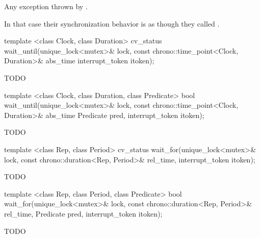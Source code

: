 {\begin{itemdescr}
  \throws Any exception thrown by .

  \pnum\sync In that case their synchronization behavior is as though they called .
\end{itemdescr}

\begin{itemdecl}
template <class Clock, class Duration>
  cv_status wait_until(unique_lock<mutex>& lock,
                       const chrono::time_point<Clock, Duration>& abs_time
                       interrupt_token itoken);
\end{itemdecl}
\begin{itemdescr}
 \pnum\effects TODO
\end{itemdescr}

\begin{itemdecl}
template <class Clock, class Duration, class Predicate>
  bool wait_until(unique_lock<mutex>& lock,
                  const chrono::time_point<Clock, Duration>& abs_time
                  Predicate pred,
                  interrupt_token itoken);
\end{itemdecl}
\begin{itemdescr}
 \pnum\effects TODO
\end{itemdescr}



%
\begin{itemdecl}
template <class Rep, class Period>
  cv_status wait_for(unique_lock<mutex>& lock,
                     const chrono::duration<Rep, Period>& rel_time,
                     interrupt_token itoken);
\end{itemdecl}
\begin{itemdescr}
 \pnum\effects TODO
\end{itemdescr}

\begin{itemdecl}
template <class Rep, class Period, class Predicate>
  bool wait_for(unique_lock<mutex>& lock,
                const chrono::duration<Rep, Period>& rel_time,
                Predicate pred,
                interrupt_token itoken);
\end{itemdecl}
\begin{itemdescr}
 \pnum\effects TODO
\end{itemdescr}

}%

